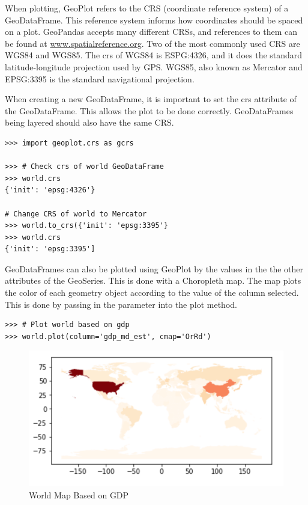 When plotting, GeoPlot refers to the CRS (coordinate reference system) of a GeoDataFrame.
This reference system informs how coordinates should be spaced on a plot.
GeoPandas accepts many different CRSs, and references to them can be found at \url{www.spatialreference.org}.
Two of the most commonly used CRS are WGS84 and WGS85.
The crs of WGS84 is ESPG:4326, and it does the standard latitude-longitude projection used by GPS.
WGS85, also known as Mercator and EPSG:3395 is the standard navigational projection.

When creating a new GeoDataFrame, it is important to set the crs attribute of the GeoDataFrame.
This allows the plot to be done correctly.
GeoDataFrames being layered should also have the same CRS.

\begin{lstlisting}
>>> import geoplot.crs as gcrs

>>> # Check crs of world GeoDataFrame
>>> world.crs
{'init': 'epsg:4326'}

# Change CRS of world to Mercator
>>> world.to_crs({'init': 'epsg:3395'}
>>> world.crs
{'init': 'epsg:3395']
\end{lstlisting}

GeoDataFrames can also be plotted using GeoPlot by the values in the the other attributes of the GeoSeries.
This is done with a Choropleth map.
The map plots the color of each geometry object according to the value of the column selected.
This is done by passing in the parameter  into the plot method.

\begin{lstlisting}
>>> # Plot world based on gdp
>>> world.plot(column='gdp_md_est', cmap='OrRd')
\end{lstlisting}

\begin{figure}[H]
\begin{center}
\includegraphics{figures/gdp.pdf}
\end{center}
\caption{World Map Based on GDP}
\end{figure}

